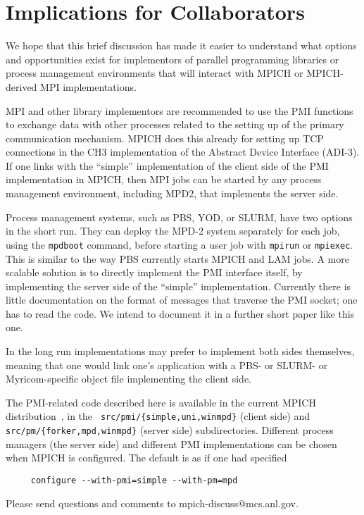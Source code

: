 \documentclass[11pt]{article}
\begin{document}
\section{Implications for Collaborators}
\label{sec:implications}

We hope that this brief discussion has made it easier to understand what
options and opportunities exist for implementors of parallel programming
libraries or process management environments that will interact with
MPICH or MPICH-derived MPI implementations.

MPI and other library implementors are recommended to use the PMI
functions to exchange data with other processes related to the setting
up of the primary communication mechanism.  MPICH does this already for
setting up TCP connections in the CH3 implementation of the Abstract
Device Interface (ADI-3).  If one links with the ``simple''
implementation of the client side of the PMI implementation in MPICH,
then MPI jobs can be started by any process management environment,
including MPD2, that implements the server side.

Process management systems, such as PBS, YOD, or SLURM, have two options
in the short run.  They can deploy the MPD-2 system separately for each
job, using the {\tt mpdboot} command, before starting a user job with
{\tt mpirun} or {\tt mpiexec}.  This is similar to the way PBS currently
starts MPICH and LAM jobs.  A more scalable solution is to directly
implement the PMI interface itself, by implementing the server side of
the ``simple'' implementation.  Currently there is little
documentation on the format of messages that traverse the PMI socket;
one has to read the code.  We intend to document it in a further short paper
like this one.

In the long run implementations may prefer to implement both sides
themselves, meaning that one would link one's application with a PBS- or
SLURM- or Myricom-specific object file implementing the client side.

The PMI-related code described here is available in the current MPICH
distribution~\cite{mpich-web-page}, in the {\tt
  src/pmi/\{simple,uni,winmpd\}} (client side) and {\tt
  src/pm/\{forker,mpd,winmpd\}} (server side) subdirectories.
Different process managers (the server side) and different PMI
implementations can be chosen when MPICH is configured.  The default is
as if one had specified
\begin{verbatim}
     configure --with-pmi=simple --with-pm=mpd
\end{verbatim}
Please send questions and comments to mpich-discuss@mcs.anl.gov.




\end{document}
